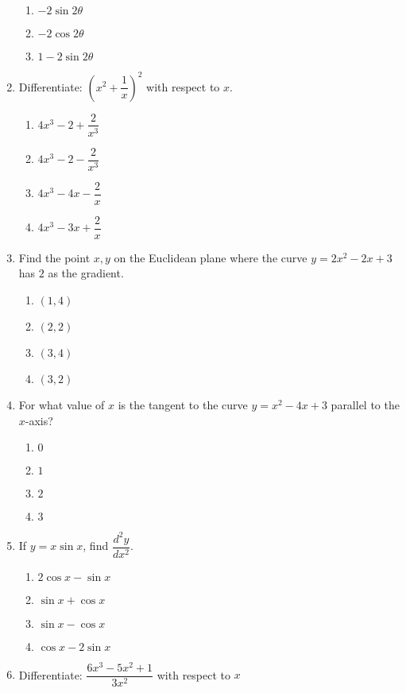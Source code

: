 \begin{multicols}{2}
\begin{enumerate}[label={\arabic*.}]
\begin{enumerate}[label={\Alph*.}]
            \item  \(-2\sin 2\theta\)
            \item  \(-2\cos 2\theta\)
            \item  \(1-2\sin 2\theta\)
        \end{enumerate}
  \item Differentiate: \(\left({x}^{2} + \dfrac{1}{x}\right)^2\) with respect to \(x\).
       \begin{enumerate}[label={\Alph*.}]
            \item  \(4{x}^{3} - 2 + \dfrac{2}{{x}^{3}}\)
            \item  \(4{x}^{3} - 2 - \dfrac{2}{{x}^{3}}\)
            \item  \(4{x}^{3} - 4x - \dfrac{2}{x}\)
            \item  \(4{x}^{3} - 3x + \dfrac{2}{x}\)
        \end{enumerate}
\item Find the point \(x,y\) on the Euclidean plane where the curve \(y = 2x^{2} - 2x +3\) has \(2\) as the gradient.
    \begin{enumerate}[label={\Alph*.}]
        \item \((1, 4)\)
        \item \((2, 2)\)
        \item \((3, 4)\)
        \item \((3, 2)\)
    \end{enumerate}  
\item For what value of \(x\) is the tangent to the curve \(y = x^{2} - 4x + 3\) parallel to the \(x\)-axis?
    \begin{enumerate}[label={\Alph*.}]
        \item \(0\)
        \item \(1\)
        \item \(2\)
        \item \(3\)
    \end{enumerate}   
\item If \(y = x \sin x\), find \( \dfrac{d^2y}{d{x}^{2}} \).
	\begin{enumerate}[label={\Alph*.}]
	\item \(2\cos x - \sin x\)
	\item \(\sin x + \cos x\)
	\item \(\sin x  - \cos  x\)
	\item \( \cos x  - 2\sin x \)
	\end{enumerate}
\item Differentiate: \(\dfrac{6x^{3} - 5x^{2} + 1}{3x^{2}}\) with respect to \(x\)

\end{enumerate}
\end{multicols}
